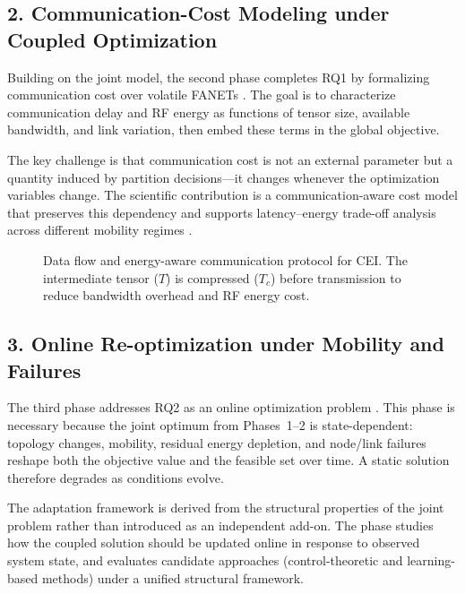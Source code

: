 \subsection*{2. Communication-Cost Modeling under Coupled Optimization}
Building on the joint model, the second phase completes RQ1 by formalizing communication cost over volatile FANETs \cite{lansky2023firefly,hosseinzadeh2024local,blanquer2024resilient,amponis2021fanet,clerigues2024mission}. The goal is to characterize communication delay and RF energy as functions of tensor size, available bandwidth, and link variation, then embed these terms in the global objective.

The key challenge is that communication cost is not an external parameter but a quantity induced by partition decisions---it changes whenever the optimization variables change. The scientific contribution is a communication-aware cost model that preserves this dependency and supports latency--energy trade-off analysis across different mobility regimes \cite{lansky2023firefly,hosseinzadeh2024local,qu2024elastic,wang2024ress,lucchesi2024dynamic,shao2020bottlenet,shao2022task,li2023device}.

\begin{figure}[H]
  \centering
  \resizebox{0.85\textwidth}{!}{}
  \caption{Data flow and energy-aware communication protocol for CEI. The intermediate tensor ($T$) is compressed ($T_c$) before transmission to reduce bandwidth overhead and RF energy cost.}
  \label{fig:workflow}
\end{figure}

\subsection*{3. Online Re-optimization under Mobility and Failures}
The third phase addresses RQ2 as an online optimization problem \cite{pan2025selfhealing,jamshidi2025resilient,blanquer2024resilient,seid2021multiagent,gao2025pmdp}. This phase is necessary because the joint optimum from Phases~1--2 is state-dependent: topology changes, mobility, residual energy depletion, and node/link failures reshape both the objective value and the feasible set over time. A static solution therefore degrades as conditions evolve.

The adaptation framework is derived from the structural properties of the joint problem rather than introduced as an independent add-on. The phase studies how the coupled solution should be updated online in response to observed system state, and evaluates candidate approaches (control-theoretic and learning-based methods) under a unified structural framework.

